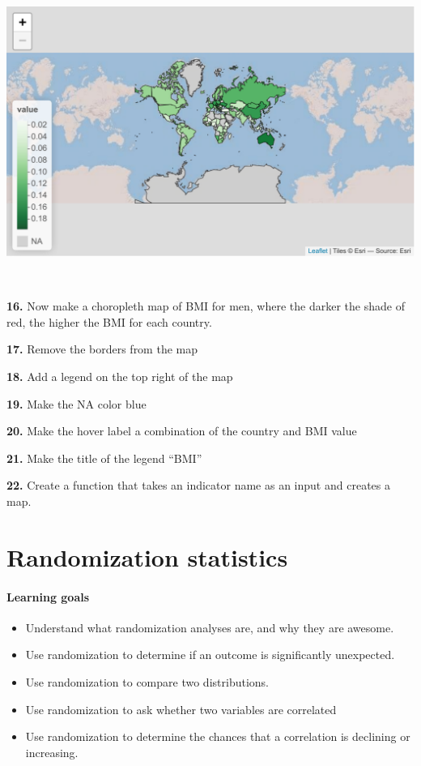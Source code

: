 \documentclass[]{book}
\providecommand{\tightlist}{%
  \setlength{\itemsep}{0pt}\setlength{\parskip}{0pt}}
\begin{document}
\includegraphics{figures/unnamed-chunk-675-1.pdf}

~

\textbf{16.} Now make a choropleth map of BMI for men, where the darker the shade of red, the higher the BMI for each country.

\textbf{17.} Remove the borders from the map

\textbf{18.} Add a legend on the top right of the map

\textbf{19.} Make the NA color blue

\textbf{20.} Make the hover label a combination of the country and BMI value

\textbf{21.} Make the title of the legend ``BMI''

\textbf{22.} Create a function that takes an indicator name as an input and creates a map.

\hypertarget{randomization-statistics}{%
\chapter{Randomization statistics}\label{randomization-statistics}}

\hypertarget{learning-goals-37}{%
\subsubsection*{Learning goals}\label{learning-goals-37}}

\begin{itemize}
\tightlist
\item
  Understand what randomization analyses are, and why they are awesome.
\item
  Use randomization to determine if an outcome is significantly unexpected.
\item
  Use randomization to compare two distributions.
\item
  Use randomization to ask whether two variables are correlated
\item
  Use randomization to determine the chances that a correlation is declining or increasing.
\end{itemize}
\end{document}
